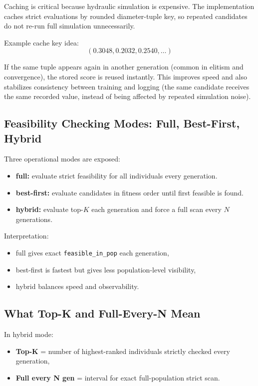 \documentclass[12pt, a4paper]{article}
\begin{document}
Caching is critical because hydraulic simulation is expensive. The implementation caches strict evaluations by rounded diameter-tuple key, so repeated candidates do not re-run full simulation unnecessarily.

Example cache key idea:
\[
	(0.3048, 0.2032, 0.2540, \dots)
\]

If the same tuple appears again in another generation (common in elitism and convergence), the stored score is reused instantly. This improves speed and also stabilizes consistency between training and logging (the same candidate receives the same recorded value, instead of being affected by repeated simulation noise).

\subsection{Feasibility Checking Modes: Full, Best-First, Hybrid}

Three operational modes are exposed:
\begin{itemize}
	\item \textbf{full:} evaluate strict feasibility for all individuals every generation.
	\item \textbf{best-first:} evaluate candidates in fitness order until first feasible is found.
	\item \textbf{hybrid:} evaluate top-$K$ each generation and force a full scan every $N$ generations.
\end{itemize}

Interpretation:
\begin{itemize}
	\item full gives exact \texttt{feasible\_in\_pop} each generation,
	\item best-first is fastest but gives less population-level visibility,
	\item hybrid balances speed and observability.
\end{itemize}

\subsection{What Top-K and Full-Every-N Mean}

In hybrid mode:
\begin{itemize}
	\item \textbf{Top-K} = number of highest-ranked individuals strictly checked every generation,
	\item \textbf{Full every N gen} = interval for exact full-population strict scan.
\end{itemize}
\end{document}
